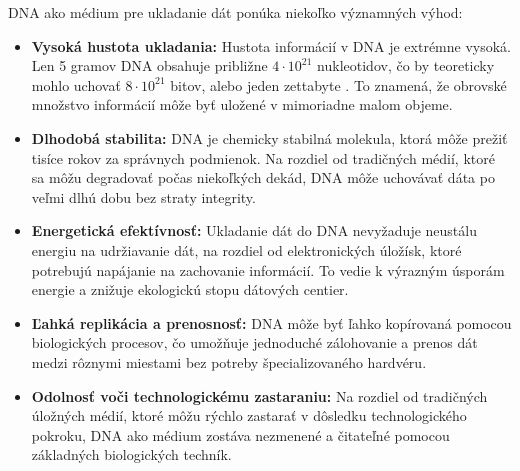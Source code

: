 DNA ako médium pre ukladanie dát ponúka niekoľko významných výhod:
\begin{itemize}
    \item \textbf{Vysoká hustota ukladania:} Hustota informácií v DNA je extrémne vysoká. Len 5 gramov DNA obsahuje približne $4\cdot10^{21}$ nukleotidov, čo by teoreticky mohlo uchovať $8\cdot10^{21}$ bitov, alebo jeden zettabyte \cite{Arxiv221105552DNAStorage}.
    To znamená, že obrovské množstvo informácií môže byť uložené v mimoriadne malom objeme.
    \item \textbf{Dlhodobá stabilita:} DNA je chemicky stabilná molekula, ktorá môže prežiť tisíce rokov za správnych podmienok. Na rozdiel od tradičných médií, ktoré sa môžu degradovať počas niekoľkých dekád, DNA môže uchovávať dáta po veľmi dlhú dobu bez straty integrity.
    \item \textbf{Energetická efektívnosť:} Ukladanie dát do DNA nevyžaduje neustálu energiu na udržiavanie dát, na rozdiel od elektronických úložísk, ktoré potrebujú napájanie na zachovanie informácií. To vedie k výrazným úsporám energie a znižuje ekologickú stopu dátových centier.
    \item \textbf{Ľahká replikácia a prenosnosť:} DNA môže byť ľahko kopírovaná pomocou biologických procesov, čo umožňuje jednoduché zálohovanie a prenos dát medzi rôznymi miestami bez potreby špecializovaného hardvéru.
    \item \textbf{Odolnosť voči technologickému zastaraniu:} Na rozdiel od tradičných úložných médií, ktoré môžu rýchlo zastarať v dôsledku technologického pokroku, DNA ako médium zostáva nezmenené a čitateľné pomocou základných biologických techník.
\end{itemize}
